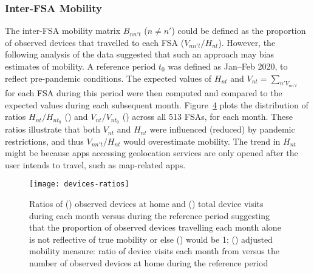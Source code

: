 \subsubsection{Inter-FSA Mobility}\label{app.mob.inter}
The inter-FSA mobility matrix $B_{nn't}$ ($n \ne n'$) could be defined as
the proportion of observed devices that travelled to each FSA ($V_{nn't} / H_{nt}$).
However, the following analysis of the data suggested that such an approach may bias estimates of mobility.
A reference period $t_0$ was defined as Jan--Feb 2020, to reflect pre-pandemic conditions.
The expected values of $H_{nt}$ and $V_{nt} = \sum_{n' V_{nn't}}$ for each FSA during this period were then
computed and compared to the expected values during each subsequent month.
Figure~\ref{fig:RHVt} plots the distribution of ratios
$H_{nt} / H_{nt_0}$ () and $V_{nt} / V_{nt_0}$ ()
across all 513 FSAs, for each month.
These ratios illustrate that both $V_{nt}$ and $H_{nt}$ were influenced (reduced) by pandemic restrictions,
and thus $V_{nn't} / H_{nt}$ would overestimate mobility.
The trend in $H_{nt}$ might be because apps accessing geolocation services are only opened
after the user intends to travel, such as map-related apps.
\begin{figure}
  \centering
  \begin{subfigure}{0pt}\label{fig:RHt}\end{subfigure}%
  \begin{subfigure}{0pt}\label{fig:RVt}\end{subfigure}%
  \begin{subfigure}{0pt}\label{fig:RH0Vt}\end{subfigure}%
  \texttt{[image: devices-ratios]}
  \caption{Ratios of () observed devices at home
    and () total device visits
    during each month versus during the reference period
    suggesting that the proportion of observed devices travelling each month
    alone is not reflective of true mobility or else () would be 1;
    () adjusted mobility measure: ratio of
    device visits each month from versus
    the number of observed devices at home during the reference period}
  \label{fig:RHVt}
\end{figure}
